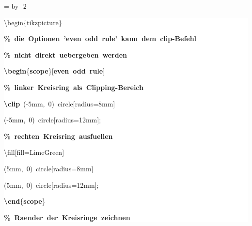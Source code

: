 \begingroup
\ttfamily
{}
=\textwidth
\advance{} by -2\fboxsep
\noindent
\colorbox{background}
{%
\parbox{\dimen255}
{%
\rule[-0.5ex]{0pt}{2.5ex}\hspace*{0.0em}\textbackslash{}begin\{tikzpicture\}\\
\rule[-0.5ex]{0pt}{2.5ex}\hspace*{1.0em}\textcolor{G}{\textbf{\%~die~Optionen~'even~odd~rule'~kann~dem~clip{-}Befehl}}\\
\rule[-0.5ex]{0pt}{2.5ex}\hspace*{1.0em}\textcolor{G}{\textbf{\%~nicht~direkt~uebergeben~werden}}\\
\rule[-0.5ex]{0pt}{2.5ex}\hspace*{1.0em}\textcolor{R}{\textbf{\textbackslash{}begin}}\{\textcolor{R}{\textbf{scope}}\}[\textcolor{R}{\textbf{even~odd~rule}}]\\
\rule[-0.5ex]{0pt}{2.5ex}\hspace*{2.0em}\textcolor{G}{\textbf{\%~linker~Kreisring~als~Clipping{-}Bereich}}\\
\rule[-0.5ex]{0pt}{2.5ex}\hspace*{2.0em}\textcolor{R}{\textbf{\textbackslash{}clip}}~({-}5mm,~0)~circle[radius=8mm]\\
\rule[-0.5ex]{0pt}{2.5ex}\hspace*{5.0em}({-}5mm,~0)~circle[radius=12mm];\\
\rule[-0.5ex]{0pt}{2.5ex}\hspace*{2.0em}\textcolor{G}{\textbf{\%~rechten~Kreisring~ausfuellen}}\\
\rule[-0.5ex]{0pt}{2.5ex}\hspace*{2.0em}\textbackslash{}fill[fill=LimeGreen]\\
\rule[-0.5ex]{0pt}{2.5ex}\hspace*{4.5em}(5mm,~0)~circle[radius=8mm]\\
\rule[-0.5ex]{0pt}{2.5ex}\hspace*{4.5em}(5mm,~0)~circle[radius=12mm];\\
\rule[-0.5ex]{0pt}{2.5ex}\hspace*{1.0em}\textcolor{R}{\textbf{\textbackslash{}end}}\{\textcolor{R}{\textbf{scope}}\}\\
\rule[-0.5ex]{0pt}{2.5ex}\hspace*{1.0em}\textcolor{G}{\textbf{\%~Raender~der~Kreisringe~zeichnen}}\\
}}
